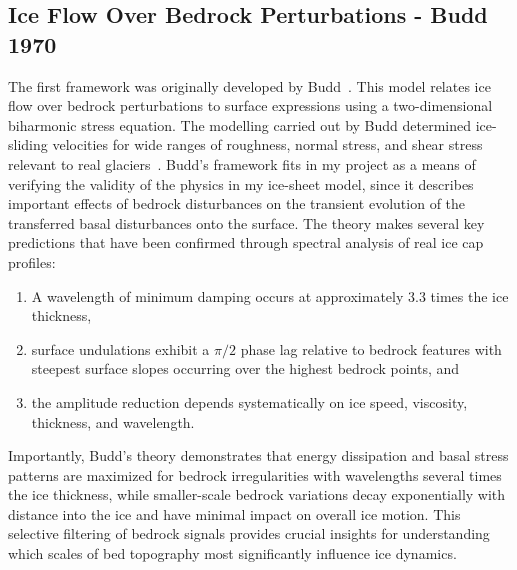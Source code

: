 \subsection{Ice Flow Over Bedrock Perturbations - Budd 1970}
The first framework was originally developed by Budd~\cite{Budd_1970}. This model relates ice flow over bedrock perturbations to surface expressions using a two-dimensional biharmonic stress equation. The modelling carried out by Budd determined ice-sliding velocities for wide ranges of roughness, normal stress, and shear stress relevant to real glaciers~\cite{Budd_1970}. Budd's framework fits in my project as a means of verifying the validity of the physics in my ice-sheet model, since it describes important effects of bedrock disturbances on the transient evolution of the transferred basal disturbances onto the surface. The theory makes several key predictions that have been confirmed through spectral analysis of real ice cap profiles: 
\begin{enumerate}
    \item A wavelength of minimum damping occurs at approximately 3.3 times the ice thickness, 
    \item surface undulations exhibit a $\pi/2$ phase lag relative to bedrock features with steepest surface slopes occurring over the highest bedrock points, and 
    \item the amplitude reduction depends systematically on ice speed, viscosity, thickness, and wavelength. 
\end{enumerate}

Importantly, Budd's theory demonstrates that energy dissipation and basal stress patterns are maximized for bedrock irregularities with wavelengths several times the ice thickness, while smaller-scale bedrock variations decay exponentially with distance into the ice and have minimal impact on overall ice motion. This selective filtering of bedrock signals provides crucial insights for understanding which scales of bed topography most significantly influence ice dynamics.

